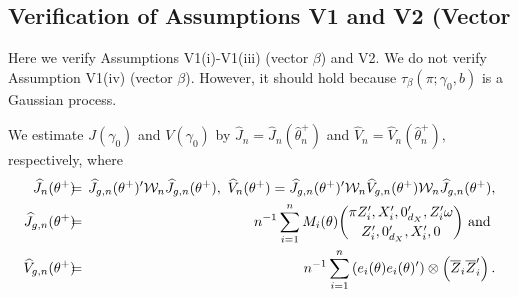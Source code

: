 \documentclass[12pt,titlepage,final,oneside,letterpaper]{article}
\begin{document}
\subsection{Verification of Assumptions V1 and V2 (Vector \beta} 

\hspace{0.25in}Here we verify Assumptions V1(i)-V1(iii) (vector $\beta $)
and V2. We do not verify Assumption V1(iv) (vector $\beta $). However, it
should hold because $\tau _{\beta }(\pi ;\gamma _{0},b)$ is a Gaussian
process.

We estimate $J(\gamma _{0})$ and $V(\gamma _{0})$ by $\widehat{J}_{n}=%
\widehat{J}_{n}(\widehat{\theta }_{n}^{+})$ and $\widehat{V}_{n}=\widehat{V}%
_{n}(\widehat{\theta }_{n}^{+}),$ respectively, where%
\begin{eqnarray}
\widehat{J}_{n}(\theta ^{+})\hspace{-0.08in} &=&\hspace{-0.08in}\widehat{J}%
_{g,n}(\theta ^{+})^{\prime }\mathcal{W}_{n}\widehat{J}_{g,n}(\theta ^{+}),%
\text{ }\widehat{V}_{n}(\theta ^{+})=\widehat{J}_{g,n}(\theta ^{+})^{\prime }%
\mathcal{W}_{n}\widehat{V}_{g,n}(\theta ^{+})\mathcal{W}_{n}\widehat{J}%
_{g,n}(\theta ^{+}),  \notag \\
\widehat{J}_{g,n}(\theta ^{+})\hspace{-0.08in} &=&\hspace{-0.08in}%
n^{-1}\sum_{i=1}^{n}M_{i}(\theta )\binom{\pi Z_{i}^{\prime },X_{i}^{\prime
},0_{d_{X}}^{\prime },Z_{i}^{\prime }\omega }{Z_{i}^{\prime
},0_{d_{X}}^{\prime },X_{i}^{\prime },0}\text{ and }  \notag \\
\widehat{V}_{g,n}(\theta ^{+})\hspace{-0.08in} &=&\hspace{-0.08in}%
n^{-1}\sum_{i=1}^{n}\left( e_{i}(\theta )e_{i}(\theta )^{\prime }\right)
\otimes \left( \overline{Z}_{i}\overline{Z}_{i}^{\prime }\right) .
\end{eqnarray}
\end{document}
